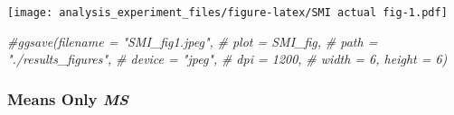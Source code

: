 \documentclass[
]{article}
\newenvironment{Shaded}{\begin{snugshade}}{\end{snugshade}}
\newcommand{\CommentTok}[1]{\textcolor[rgb]{0.56,0.35,0.01}{\textit{#1}}}
\begin{document}
\texttt{[image: analysis\_experiment\_files/figure-latex/SMI actual fig-1.pdf]}

\begin{Shaded}
\begin{Highlighting}[]
\CommentTok{\#ggsave(filename = "SMI\_fig1.jpeg",}
 \CommentTok{\#      plot = SMI\_fig,}
  \CommentTok{\#     path = "./results\_figures",}
   \CommentTok{\#    device = "jpeg",}
    \CommentTok{\#   dpi = 1200,}
     \CommentTok{\#  width = 6, height = 6)}
\end{Highlighting}
\end{Shaded}

\hypertarget{means-only-ms}{%
\subsubsection{\texorpdfstring{Means Only
\emph{MS}}{Means Only MS}}\label{means-only-ms}}
\end{document}
